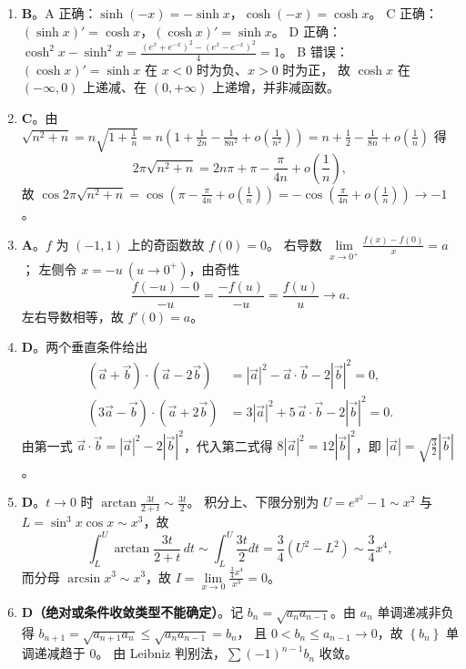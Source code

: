 \begin{enumerate}
{\begin{enumerate}
	\item
	\textbf{B}。A 正确：$\sinh(-x)=-\sinh x$，$\cosh(-x)=\cosh x$。
	C 正确：$(\sinh x)'=\cosh x$，$(\cosh x)'=\sinh x$。
	D 正确：$\cosh^2x-\sinh^2x=\frac{\left(e^x+e^{-x}\right)^2-\left(e^x-e^{-x}\right)^2}{4}=1$。
	B 错误：$(\cosh x)'=\sinh x$ 在 $x<0$ 时为负、$x>0$ 时为正，
	故 $\cosh x$ 在 $(-\infty,0)$ 上递减、在 $(0,+\infty)$ 上递增，并非减函数。

	\item
	\textbf{C}。由
	$\sqrt{n^2+n}=n\sqrt{1+\frac1n}=n\left(1+\frac{1}{2n}-\frac{1}{8n^2}+o\left(\frac{1}{n^2}\right)\right)
	=n+\frac12-\frac{1}{8n}+o\left(\frac1n\right)$ 得
	\[
	2\pi\sqrt{n^2+n}=2n\pi+\pi-\frac{\pi}{4n}+o\left(\frac1n\right),
	\]
	故 $\cos2\pi\sqrt{n^2+n}=\cos\left(\pi-\frac{\pi}{4n}+o\left(\frac1n\right)\right)
	=-\cos\left(\frac{\pi}{4n}+o\left(\frac1n\right)\right)\to-1$。

	\item
	\textbf{A}。$f$ 为 $(-1,1)$ 上的奇函数故 $f(0)=0$。
	右导数 $\lim\limits_{x\to0^{+}}\frac{f(x)-f(0)}{x}=a$；
	左侧令 $x=-u\ (u\to0^{+})$，由奇性
	\[
	\frac{f(-u)-0}{-u}=\frac{-f(u)}{-u}=\frac{f(u)}{u}\to a .
	\]
	左右导数相等，故 $f'(0)=a$。

	\item
	\textbf{D}。两个垂直条件给出
	\begin{align*}
	(\vec{a}+\vec{b})\cdot(\vec{a}-2\vec{b})&=|\vec{a}|^2-\vec{a}\cdot\vec{b}-2|\vec{b}|^2=0,\\
	(3\vec{a}-\vec{b})\cdot(\vec{a}+2\vec{b})&=3|\vec{a}|^2+5\,\vec{a}\cdot\vec{b}-2|\vec{b}|^2=0 .
	\end{align*}
	由第一式 $\vec{a}\cdot\vec{b}=|\vec{a}|^2-2|\vec{b}|^2$，代入第二式得
	$8|\vec{a}|^2=12|\vec{b}|^2$，即 $|\vec{a}|=\sqrt{\frac{3}{2}}|\vec{b}|$。

	\item
	\textbf{D}。$t\to0$ 时 $\arctan\frac{3t}{2+t}\sim\frac{3t}{2}$。
	积分上、下限分别为 $U=e^{x^2}-1\sim x^2$ 与 $L=\sin^3x\cos x\sim x^3$，故
	\[
	\int_{L}^{U}\arctan\frac{3t}{2+t}\,dt\sim\int_{L}^{U}\frac{3t}{2}dt=\frac34\left(U^2-L^2\right)
	\sim\frac34x^4 ,
	\]
	而分母 $\arcsin x^3\sim x^3$，故 $I=\lim\limits_{x\to0}\frac{\frac34x^4}{x^3}=0$。

	\item
	\textbf{D（绝对或条件收敛类型不能确定）}。记 $b_n=\sqrt{a_na_{n-1}}$。由 $a_n$ 单调递减非负得
	$b_{n+1}=\sqrt{a_{n+1}a_n}\leqslant\sqrt{a_na_{n-1}}=b_n$，
	且 $0<b_n\leqslant a_{n-1}\to0$，故 $\left\{b_n\right\}$ 单调递减趋于 $0$。
	由 Leibniz 判别法，$\sum(-1)^{n-1}b_n$ 收敛。


\end{enumerate}}
\end{enumerate}
